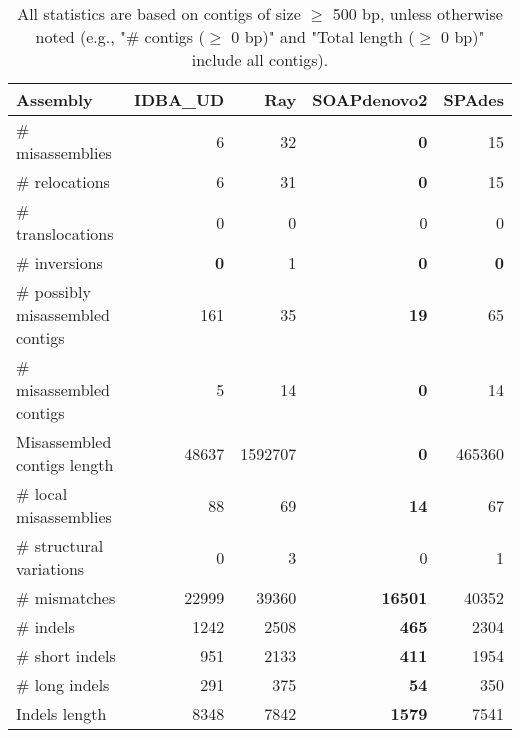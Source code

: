 \documentclass[12pt,a4paper]{article}
\begin{document}
\begin{table}[ht]
\begin{center}
\caption{All statistics are based on contigs of size $\geq$ 500 bp, unless otherwise noted (e.g., "\# contigs ($\geq$ 0 bp)" and "Total length ($\geq$ 0 bp)" include all contigs).}
\begin{tabular}{|l*{4}{|r}|}
\hline
Assembly & IDBA\_UD & Ray & SOAPdenovo2 & SPAdes \\ \hline
\# misassemblies & 6 & 32 & {\bf 0} & 15 \\ \hline
\hspace{5mm}\# relocations & 6 & 31 & {\bf 0} & 15 \\ \hline
\hspace{5mm}\# translocations & 0 & 0 & 0 & 0 \\ \hline
\hspace{5mm}\# inversions & {\bf 0} & 1 & {\bf 0} & {\bf 0} \\ \hline
\# possibly misassembled contigs & 161 & 35 & {\bf 19} & 65 \\ \hline
\# misassembled contigs & 5 & 14 & {\bf 0} & 14 \\ \hline
Misassembled contigs length & 48637 & 1592707 & {\bf 0} & 465360 \\ \hline
\# local misassemblies & 88 & 69 & {\bf 14} & 67 \\ \hline
\# structural variations & 0 & 3 & 0 & 1 \\ \hline
\# mismatches & 22999 & 39360 & {\bf 16501} & 40352 \\ \hline
\# indels & 1242 & 2508 & {\bf 465} & 2304 \\ \hline
\hspace{5mm}\# short indels & 951 & 2133 & {\bf 411} & 1954 \\ \hline
\hspace{5mm}\# long indels & 291 & 375 & {\bf 54} & 350 \\ \hline
Indels length & 8348 & 7842 & {\bf 1579} & 7541 \\ \hline
\end{tabular}
\end{center}
\end{table}
\end{document}
